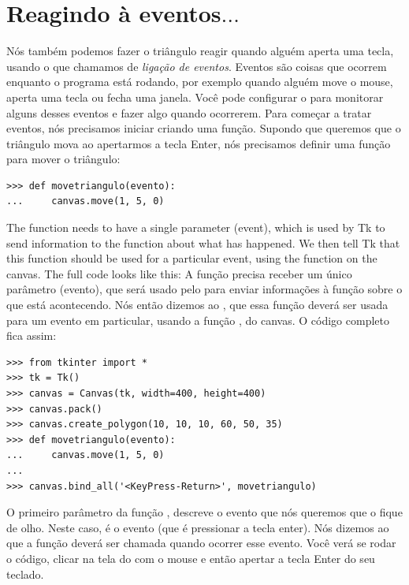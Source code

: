 {\section{Reagindo à eventos$\ldots$}

Nós também podemos fazer o triângulo reagir quando alguém aperta uma tecla, usando o que chamamos de \emph{ligação de eventos}. Eventos são coisas que ocorrem enquanto o programa está rodando, por exemplo quando alguém move o mouse, aperta uma tecla ou fecha uma janela. Você pode configurar o  para monitorar alguns desses eventos e fazer algo quando ocorrerem. Para começar a tratar eventos, nós precisamos iniciar criando uma função. Supondo que queremos que o triângulo mova ao apertarmos a tecla Enter, nós precisamos definir uma função para mover o triângulo:

\begin{listing}
\begin{verbatim}
>>> def movetriangulo(evento):
...     canvas.move(1, 5, 0)
\end{verbatim}
\end{listing}

The function needs to have a single parameter (event), which is used by Tk to send information to the function about what has happened.  We then tell Tk that this function should be used for a particular event, using the  function on the canvas. The full code looks like this:
A função precisa receber um único parâmetro (evento), que será usado pelo  para enviar informações à função sobre o que está acontecendo. Nós então dizemos ao , que essa função deverá ser usada para um evento em particular, usando a função , do canvas. O código completo fica assim:

\begin{listing}
\begin{verbatim}
>>> from tkinter import *
>>> tk = Tk()
>>> canvas = Canvas(tk, width=400, height=400)
>>> canvas.pack()
>>> canvas.create_polygon(10, 10, 10, 60, 50, 35)
>>> def movetriangulo(evento):
...     canvas.move(1, 5, 0)
...
>>> canvas.bind_all('<KeyPress-Return>', movetriangulo)
\end{verbatim}
\end{listing}

O primeiro parâmetro da função , descreve o evento que nós queremos que o  fique de olho. Neste caso, é o evento  (que é pressionar a tecla enter). Nós dizemos ao  que a função  deverá ser chamada quando ocorrer esse evento. Você verá se rodar o código, clicar na tela do  com o mouse e então apertar a tecla Enter do seu teclado.

}
